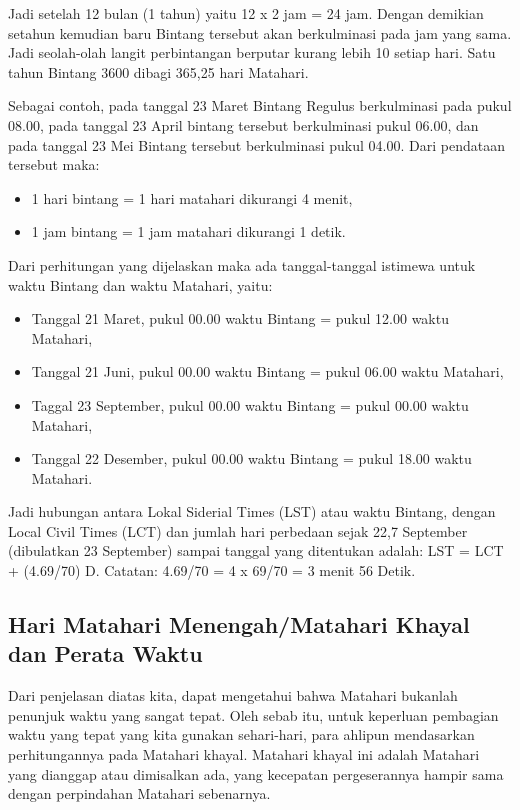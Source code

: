 Jadi setelah 12 bulan (1 tahun) yaitu  12 x 2 jam = 24 jam. Dengan demikian setahun
 kemudian baru Bintang tersebut akan berkulminasi pada jam yang sama. 
 Jadi seolah-olah langit perbintangan berputar kurang lebih 10 setiap hari. 
 Satu tahun Bintang 3600 dibagi 365,25 hari Matahari.

Sebagai contoh, pada tanggal 23 Maret Bintang Regulus berkulminasi pada pukul 08.00,
 pada tanggal 23 April bintang tersebut berkulminasi pukul 06.00, dan pada tanggal 23 Mei 
 Bintang tersebut berkulminasi pukul 04.00. Dari pendataan tersebut maka: 
\begin{itemize}
 \item 1 hari bintang = 1 hari matahari dikurangi 4 menit, 
 \item 1 jam bintang = 1 jam matahari dikurangi 1 detik. 
\end{itemize}
 Dari perhitungan yang dijelaskan maka ada tanggal-tanggal istimewa 
 untuk waktu Bintang dan waktu Matahari, yaitu:
 \begin{itemize}
	\item Tanggal 21 Maret, pukul 00.00 waktu Bintang = pukul 12.00 waktu Matahari,
	\item Tanggal 21 Juni, pukul 00.00 waktu Bintang = pukul 06.00 waktu Matahari,
	\item Taggal 23 September, pukul 00.00 waktu Bintang = pukul 00.00 waktu Matahari,
	\item Tanggal 22 Desember, pukul 00.00 waktu Bintang = pukul 18.00 waktu Matahari.
	\end{itemize}
 Jadi hubungan antara Lokal Siderial Times (LST) atau waktu Bintang, 
 dengan Local Civil Times (LCT) dan jumlah hari perbedaan sejak 22,7 September 
 (dibulatkan 23 September) sampai tanggal yang ditentukan adalah:
 LST = LCT + (4.69/70) D. Catatan: 4.69/70 = 4 x 69/70 = 3 menit 56 Detik.	
 
\subsection{Hari Matahari Menengah/Matahari Khayal dan Perata Waktu}
 Dari penjelasan diatas kita, dapat mengetahui bahwa Matahari bukanlah penunjuk 
 waktu yang sangat tepat. Oleh sebab itu, untuk keperluan pembagian waktu yang tepat
 yang kita gunakan sehari-hari, para ahlipun mendasarkan perhitungannya pada Matahari
 khayal. Matahari khayal ini adalah Matahari yang dianggap atau dimisalkan ada, 
 yang kecepatan pergeserannya hampir sama dengan perpindahan Matahari sebenarnya.
 
